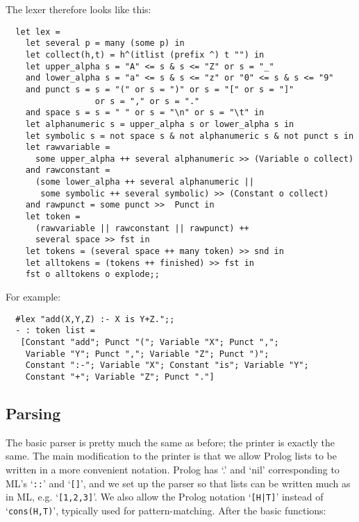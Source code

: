 \noindent The lexer therefore looks like this:

\begin{boxed}\begin{lstlisting}
  let lex =
    let several p = many (some p) in
    let collect(h,t) = h^(itlist (prefix ^) t "") in
    let upper_alpha s = "A" <= s & s <= "Z" or s = "_"
    and lower_alpha s = "a" <= s & s <= "z" or "0" <= s & s <= "9"
    and punct s = s = "(" or s = ")" or s = "[" or s = "]"
                  or s = "," or s = "."
    and space s = s = " " or s = "\n" or s = "\t" in
    let alphanumeric s = upper_alpha s or lower_alpha s in
    let symbolic s = not space s & not alphanumeric s & not punct s in
    let rawvariable =
      some upper_alpha ++ several alphanumeric >> (Variable o collect)
    and rawconstant =
      (some lower_alpha ++ several alphanumeric ||
       some symbolic ++ several symbolic) >> (Constant o collect)
    and rawpunct = some punct >>  Punct in
    let token =
      (rawvariable || rawconstant || rawpunct) ++
      several space >> fst in
    let tokens = (several space ++ many token) >> snd in
    let alltokens = (tokens ++ finished) >> fst in
    fst o alltokens o explode;;
\end{lstlisting}\end{boxed}

\noindent For example:

\begin{boxed}\begin{verbatim}
  #lex "add(X,Y,Z) :- X is Y+Z.";;
  - : token list =
   [Constant "add"; Punct "("; Variable "X"; Punct ",";
    Variable "Y"; Punct ","; Variable "Z"; Punct ")";
    Constant ":-"; Variable "X"; Constant "is"; Variable "Y";
    Constant "+"; Variable "Z"; Punct "."]
\end{verbatim}\end{boxed}

\subsection{Parsing}

The basic parser is pretty much the same as before; the printer is exactly the
same. The main modification to the printer is that we allow Prolog lists to be
written in a more convenient notation. Prolog has `.' and `nil' corresponding
to ML's `{\tt ::}' and `{\tt []}', and we set up the parser so that lists can
be written much as in ML, e.g. `{\tt [1,2,3]}'. We also allow the Prolog
notation `{\verb+[H|T]+}' instead of `{\verb+cons(H,T)+}', typically used for
pattern-matching. After the basic functions:

